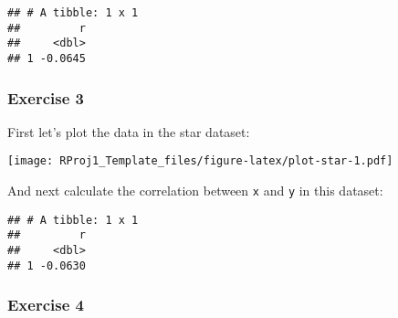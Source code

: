 \documentclass[
]{article}
\newenvironment{Shaded}{\begin{snugshade}}{\end{snugshade}}
\newcommand{\DataTypeTok}[1]{\textcolor[rgb]{0.13,0.29,0.53}{#1}}
\newcommand{\KeywordTok}[1]{\textcolor[rgb]{0.13,0.29,0.53}{\textbf{#1}}}
\newcommand{\NormalTok}[1]{#1}
\newcommand{\OperatorTok}[1]{\textcolor[rgb]{0.81,0.36,0.00}{\textbf{#1}}}
\newcommand{\StringTok}[1]{\textcolor[rgb]{0.31,0.60,0.02}{#1}}
\begin{document}
\begin{Shaded}
\end{Shaded}

\begin{verbatim}
## # A tibble: 1 x 1
##         r
##     <dbl>
## 1 -0.0645
\end{verbatim}

\hypertarget{exercise-3}{%
\subsubsection{Exercise 3}\label{exercise-3}}

First let's plot the data in the star dataset:

\begin{Shaded}
\end{Shaded}

\texttt{[image: RProj1\_Template\_files/figure-latex/plot-star-1.pdf]}

And next calculate the correlation between \texttt{x} and \texttt{y} in
this dataset:

\begin{Shaded}
\end{Shaded}

\begin{verbatim}
## # A tibble: 1 x 1
##         r
##     <dbl>
## 1 -0.0630
\end{verbatim}

\hypertarget{exercise-4}{%
\subsubsection{Exercise 4}\label{exercise-4}}
\end{document}
